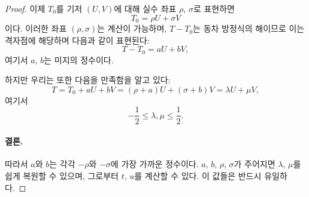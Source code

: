 \begin{proof}
    이제 $T_0$를 기저 $(U, V)$에 대해 실수 좌표 $\rho$, $\sigma$로 표현하면  
    \[
    T_0 = \rho U + \sigma V
    \]
    이다. 이러한 좌표 $(\rho, \sigma)$는 계산이 가능하며, $T - T_0$는 동차 방정식의 해이므로  
    이는 격자점에 해당하며 다음과 같이 표현된다:
    \[
    T - T_0 = aU + bV,
    \]
    여기서 $a$, $b$는 미지의 정수이다.

    하지만 우리는 또한 다음을 만족함을 알고 있다:
    \[
    T = T_0 + aU + bV = (\rho + a)U + (\sigma + b)V = \lambda U + \mu V,
    \]
    여기서
    \[
    -\frac{1}{2} \leq \lambda, \mu \leq \frac{1}{2}.
    \]

    \paragraph{결론.} 
    따라서 $a$와 $b$는 각각 $-\rho$와 $-\sigma$에 가장 가까운 정수이다.  
    $a$, $b$, $\rho$, $\sigma$가 주어지면 $\lambda$, $\mu$를 쉽게 복원할 수 있으며,  
    그로부터 $t$, $u$를 계산할 수 있다. 이 값들은 반드시 유일하다.
\end{proof}